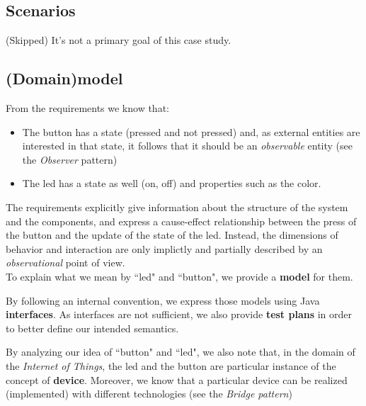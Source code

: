 \documentclass{article}
\newcommand{\labelssec}[1]{\label{ssec:#1}}
\begin{document}
\subsection{Scenarios}
\labelssec{Scenarios}

 (Skipped) It's not a primary goal of this case study.

\subsection{(Domain)model}



From the requirements we know that:

\begin{itemize}
  \item The button has a state (pressed
  and not pressed) and, as external entities are interested in that state, it
  follows that it should be an \emph{observable} entity (see the
  \emph{Observer} pattern)
  \item The led has a state as well (on, off) and properties such as the color.
\end{itemize}

The requirements explicitly give information about the structure of the system
and the components, and express a cause-effect relationship between the press of
the button and the update of the state of the led. Instead, the dimensions of
behavior and interaction are only implictly and partially described by an
\emph{observational} point of view.	\\
 
To explain what we mean by ``led" and ``button", we provide a \textbf{model} for
them.

By following an internal convention, we express those models using Java
\textbf{interfaces}. As interfaces are not sufficient, we also provide
\textbf{test plans} in order to better define our intended semantics.
 
By analyzing our idea of ``button" and ``led", we also note that, in the domain
of the \emph{Internet of Things}, the led and the button are particular
instance of the concept of \textbf{device}. Moreover, we know that a
particular device can be realized (implemented) with different technologies
(see the \emph{Bridge pattern})

    
\end{document}
